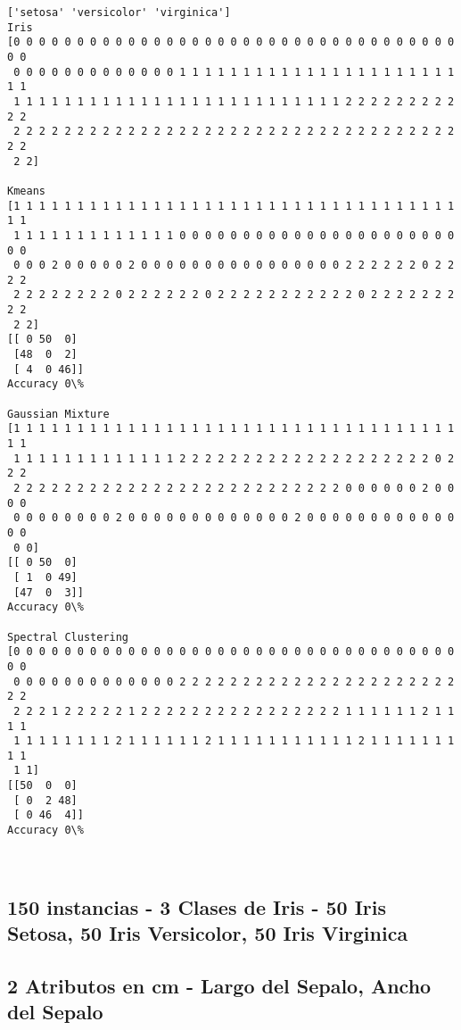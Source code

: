 \documentclass[11pt]{article}
\begin{document}
    \begin{Verbatim}[commandchars=\\\{\}]
['setosa' 'versicolor' 'virginica']
Iris
[0 0 0 0 0 0 0 0 0 0 0 0 0 0 0 0 0 0 0 0 0 0 0 0 0 0 0 0 0 0 0 0 0 0 0 0 0
 0 0 0 0 0 0 0 0 0 0 0 0 0 1 1 1 1 1 1 1 1 1 1 1 1 1 1 1 1 1 1 1 1 1 1 1 1
 1 1 1 1 1 1 1 1 1 1 1 1 1 1 1 1 1 1 1 1 1 1 1 1 1 1 2 2 2 2 2 2 2 2 2 2 2
 2 2 2 2 2 2 2 2 2 2 2 2 2 2 2 2 2 2 2 2 2 2 2 2 2 2 2 2 2 2 2 2 2 2 2 2 2
 2 2]

Kmeans
[1 1 1 1 1 1 1 1 1 1 1 1 1 1 1 1 1 1 1 1 1 1 1 1 1 1 1 1 1 1 1 1 1 1 1 1 1
 1 1 1 1 1 1 1 1 1 1 1 1 1 0 0 0 0 0 0 0 0 0 0 0 0 0 0 0 0 0 0 0 0 0 0 0 0
 0 0 0 2 0 0 0 0 0 2 0 0 0 0 0 0 0 0 0 0 0 0 0 0 0 0 2 2 2 2 2 2 0 2 2 2 2
 2 2 2 2 2 2 2 2 0 2 2 2 2 2 2 0 2 2 2 2 2 2 2 2 2 2 2 0 2 2 2 2 2 2 2 2 2
 2 2]
[[ 0 50  0]
 [48  0  2]
 [ 4  0 46]]
Accuracy 0\%

Gaussian Mixture
[1 1 1 1 1 1 1 1 1 1 1 1 1 1 1 1 1 1 1 1 1 1 1 1 1 1 1 1 1 1 1 1 1 1 1 1 1
 1 1 1 1 1 1 1 1 1 1 1 1 1 2 2 2 2 2 2 2 2 2 2 2 2 2 2 2 2 2 2 2 2 0 2 2 2
 2 2 2 2 2 2 2 2 2 2 2 2 2 2 2 2 2 2 2 2 2 2 2 2 2 2 0 0 0 0 0 0 2 0 0 0 0
 0 0 0 0 0 0 0 0 2 0 0 0 0 0 0 0 0 0 0 0 0 0 2 0 0 0 0 0 0 0 0 0 0 0 0 0 0
 0 0]
[[ 0 50  0]
 [ 1  0 49]
 [47  0  3]]
Accuracy 0\%

Spectral Clustering
[0 0 0 0 0 0 0 0 0 0 0 0 0 0 0 0 0 0 0 0 0 0 0 0 0 0 0 0 0 0 0 0 0 0 0 0 0
 0 0 0 0 0 0 0 0 0 0 0 0 0 2 2 2 2 2 2 2 2 2 2 2 2 2 2 2 2 2 2 2 2 2 2 2 2
 2 2 2 1 2 2 2 2 2 1 2 2 2 2 2 2 2 2 2 2 2 2 2 2 2 2 1 1 1 1 1 1 2 1 1 1 1
 1 1 1 1 1 1 1 1 2 1 1 1 1 1 1 2 1 1 1 1 1 1 1 1 1 1 1 2 1 1 1 1 1 1 1 1 1
 1 1]
[[50  0  0]
 [ 0  2 48]
 [ 0 46  4]]
Accuracy 0\%

    \end{Verbatim}

    \begin{center}
    \end{center}
    { \hspace*{\fill} \\}
    
    \subsection{150 instancias - 3 Clases de Iris - 50 Iris Setosa, 50 Iris
Versicolor, 50 Iris
Virginica}\label{instancias---3-clases-de-iris---50-iris-setosa-50-iris-versicolor-50-iris-virginica}

\subsection{2 Atributos en cm - Largo del Sepalo, Ancho del
Sepalo}\label{atributos-en-cm---largo-del-sepalo-ancho-del-sepalo}
\end{document}
